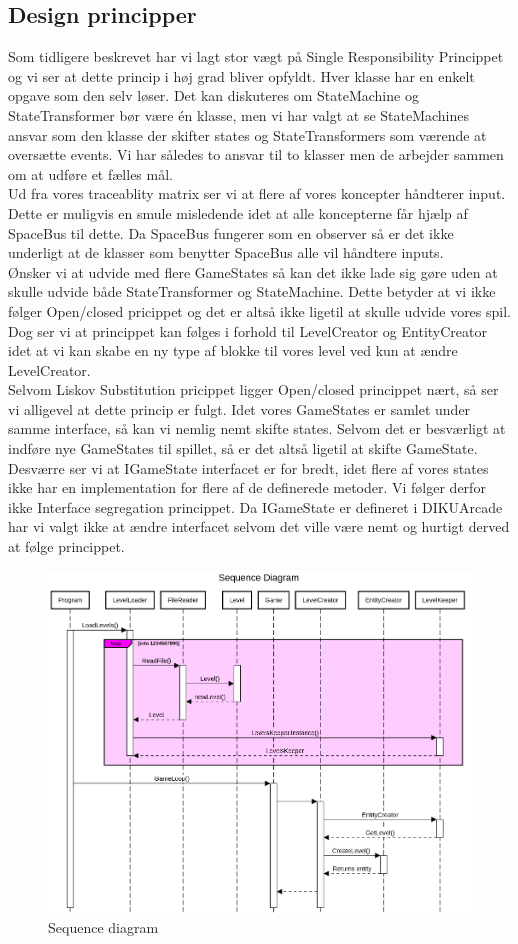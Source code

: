 \subsection{Design principper}
Som tidligere beskrevet har vi lagt stor vægt på Single Responsibility Princippet og vi ser at dette princip i høj grad bliver opfyldt. Hver klasse har en enkelt opgave som den selv løser. Det kan diskuteres om StateMachine og StateTransformer bør være én klasse, men vi har valgt at se StateMachines ansvar som den klasse der skifter states og StateTransformers som værende at oversætte events. Vi har således to ansvar til to klasser men de arbejder sammen om at udføre et fælles mål.\\
Ud fra vores traceablity matrix ser vi at flere af vores koncepter håndterer input. Dette er muligvis en smule misledende idet at alle koncepterne får hjælp af SpaceBus til dette. Da SpaceBus fungerer som en observer så er det ikke underligt at de klasser som benytter SpaceBus alle vil håndtere inputs.\\

Ønsker vi at udvide med flere GameStates så kan det ikke lade sig gøre uden at skulle udvide både StateTransformer og StateMachine. Dette betyder at vi ikke følger Open/closed pricippet og det er altså ikke ligetil at skulle udvide vores spil. Dog ser vi at princippet kan følges i forhold til LevelCreator og EntityCreator idet at vi kan skabe en ny type af blokke til vores level ved kun at ændre LevelCreator.\\

Selvom Liskov Substitution pricippet ligger Open/closed princippet nært, så ser vi alligevel at dette princip er fulgt. Idet vores GameStates er samlet under samme interface, så kan vi nemlig nemt skifte states. Selvom det er besværligt at indføre nye GameStates til spillet, så er det altså ligetil at skifte GameState.\\

Desværre ser vi at IGameState interfacet er for bredt, idet flere af vores states ikke har en implementation for flere af de definerede metoder. Vi følger derfor ikke Interface segregation princippet. Da IGameState er defineret i DIKUArcade har vi valgt ikke at ændre interfacet selvom det ville være nemt og hurtigt derved at følge princippet.\\

\begin{figure}[h!]
  \includegraphics[width=\linewidth]{latex/Images/SequenceDiagram.png}
  \caption{Sequence diagram}
  \label{seqDig}
\end{figure}
